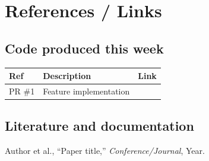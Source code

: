 \section{References / Links}

\subsection*{Code produced this week}
\begin{table}[H]
\centering
\small
\begin{tabularx}{\textwidth}{@{}l L l@{}}
\toprule
\textbf{Ref} & \textbf{Description} & \textbf{Link} \\
\midrule
PR \#1 & Feature implementation &  \\
\bottomrule
\end{tabularx}
\end{table}

\subsection*{Literature and documentation}
\begin{thebibliography}{9}
\small
{} Author et al., ``Paper title,'' \emph{Conference/Journal}, Year.
\end{thebibliography}
% 
